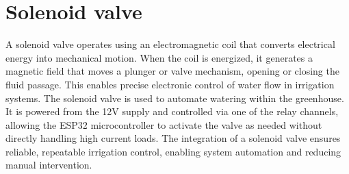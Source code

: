 \section{Solenoid valve}

A solenoid valve operates using an electromagnetic coil that converts electrical energy into mechanical motion. \cite{solenoid} When the coil is energized, it generates a magnetic field that moves a plunger or valve mechanism, opening or closing the fluid passage. This enables precise electronic control of water flow in irrigation systems. The solenoid valve is used to automate watering within the greenhouse. It is powered from the 12V supply and controlled via one of the relay channels, allowing the ESP32 microcontroller to activate the valve as needed without directly handling high current loads. The integration of a solenoid valve ensures reliable, repeatable irrigation control, enabling system automation and reducing manual intervention. 
